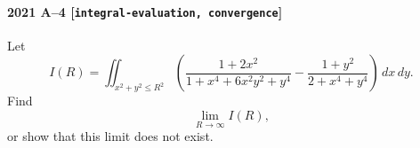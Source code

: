 \paragraph{2021 A--4 \textnormal{[\texttt{integral-evaluation, convergence}]}}
Let
\[
I(R) = \iint_{x^2+y^2 \leq R^2} \left( \frac{1+2x^2}{1+x^4+6x^2y^2+y^4} - \frac{1+y^2}{2+x^4+y^4} \right)\,dx\,dy.
\]
Find
\[
\lim_{R \to \infty} I(R),
\]
or show that this limit does not exist.
